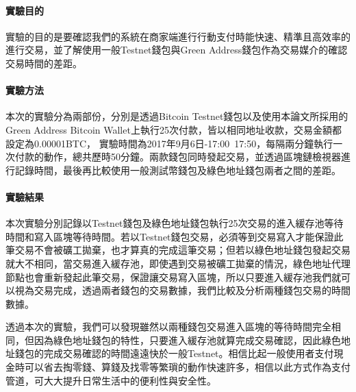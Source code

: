 			\paragraph{實驗目的}實驗的目的是要確認我們的系統在商家端進行行動支付時能快速、精準且高效率的進行交易，並了解使用一般Testnet錢包與Green Address錢包作為交易媒介的確認交易時間的差距。
			\paragraph{實驗方法}本次的實驗分為兩部份，分別是透過Bitcoin Testnet錢包以及使用本論文所採用的Green Address Bitcoin Wallet上執行25次付款，皆以相同地址收款，交易金額都設定為0.00001BTC， 實驗時間為2017年9月6日-17:00~17:50，每隔兩分鐘執行一次付款的動作，總共歷時50分鐘。兩款錢包同時發起交易，並透過區塊鏈檢視器進行記錄時間，最後再比較使用一般測試幣錢包及綠色地址錢包兩者之間的差距。
			\paragraph{實驗結果}本次實驗分別記錄以Testnet錢包及綠色地址錢包執行25次交易的進入緩存池等待時間和寫入區塊等待時間。若以Testnet錢包交易，必須等到交易寫入才能保證此筆交易不會被礦工拋棄，也才算真的完成這筆交易；但若以綠色地址錢包發起交易就大不相同，當交易進入緩存池，即使遇到交易被礦工拋棄的情況，綠色地址代理節點也會重新發起此筆交易，保證讓交易寫入區塊，所以只要進入緩存池我們就可以視為交易完成，透過兩者錢包的交易數據，我們比較及分析兩種錢包交易的時間數據。


透過本次的實驗，我們可以發現雖然以兩種錢包交易進入區塊的等待時間完全相同，但因為綠色地址錢包的特性，只要進入緩存池就算完成交易確認，因此綠色地址錢包的完成交易確認的時間遠遠快於一般Testnet。相信比起一般使用者支付現金時可以省去掏零錢、算錢及找零等繁瑣的動作快速許多，相信以此方式作為支付管道，可大大提升日常生活中的便利性與安全性。


    

